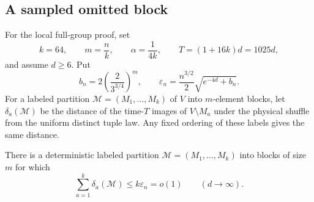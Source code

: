 \subsection{A sampled omitted block}

For the local full-group proof, set
\begin{equation}\label{eq:marginal-constants}
 k=64,\qquad m=\frac{n}{k},\qquad
 \alpha=\frac1{4k},\qquad T=(1+16k)d=1025d,
\end{equation}
and assume $d\ge6$. Put
\begin{equation}\label{eq:marginal-error}
 b_n=2\left(\frac{2}{3^{3/4}}\right)^m,\qquad
 \varepsilon_n=\frac{n^{3/2}}2\sqrt{e^{-4d}+b_n}.
\end{equation}
For a labeled partition $\mathcal M=(M_1,\ldots,M_k)$ of $V$
into $m$-element blocks, let $\delta_a(\mathcal M)$ be the
distance of the time-$T$ images of $V\setminus M_a$ under the
physical shuffle from the uniform distinct tuple law. Any fixed
ordering of these labels gives the same distance.

\begin{proposition}
\label{prop:marginals}
There is a deterministic labeled partition
$\mathcal M=(M_1,\ldots,M_k)$ into blocks of size $m$ for which
\begin{equation}\label{eq:marginal-partition}
 \sum_{a=1}^k\delta_a(\mathcal M)
 \le k\varepsilon_n=o(1)\qquad(d\longrightarrow\infty).
\end{equation}
\end{proposition}


